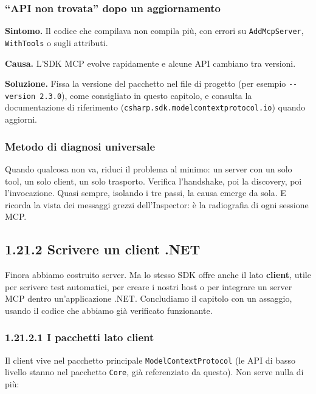 \documentclass[
  italian,
  10pt,
]{book}
\begin{document}
\subsubsection{``API non trovata'' dopo un
aggiornamento}\label{api-non-trovata-dopo-un-aggiornamento}

\textbf{Sintomo.} Il codice che compilava non compila più, con errori su
\texttt{AddMcpServer}, \texttt{WithTools} o sugli attributi.

\textbf{Causa.} L'SDK MCP evolve rapidamente e alcune API cambiano tra
versioni.

\textbf{Soluzione.} Fissa la versione del pacchetto nel file di progetto
(per esempio \texttt{-\/-version\ 2.3.0}), come consigliato in questo
capitolo, e consulta la documentazione di riferimento
(\texttt{csharp.sdk.modelcontextprotocol.io}) quando aggiorni.

\subsubsection{Metodo di diagnosi
universale}\label{metodo-di-diagnosi-universale}

Quando qualcosa non va, riduci il problema al minimo: un server con un
solo tool, un solo client, un solo trasporto. Verifica l'handshake, poi
la discovery, poi l'invocazione. Quasi sempre, isolando i tre passi, la
causa emerge da sola. E ricorda la vista dei messaggi grezzi
dell'Inspector: è la radiografia di ogni sessione MCP.

\subsection{1.21.2 Scrivere un client
.NET}\label{scrivere-un-client-.net}

Finora abbiamo costruito server. Ma lo stesso SDK offre anche il lato
\textbf{client}, utile per scrivere test automatici, per creare i nostri
host o per integrare un server MCP dentro un'applicazione .NET.
Concludiamo il capitolo con un assaggio, usando il codice che abbiamo
già verificato funzionante.

\subsubsection{1.21.2.1 I pacchetti lato
client}\label{i-pacchetti-lato-client}

Il client vive nel pacchetto principale \texttt{ModelContextProtocol}
(le API di basso livello stanno nel pacchetto \texttt{Core}, già
referenziato da questo). Non serve nulla di più:
\end{document}
